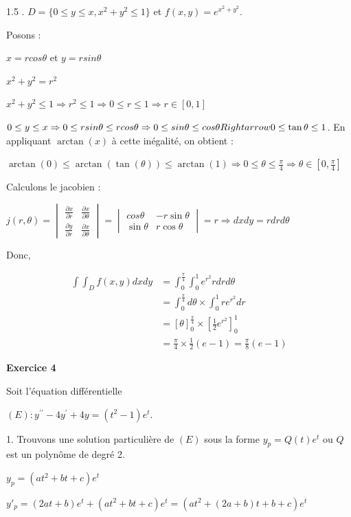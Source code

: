 \documentclass[12pt]{article}
\begin{document}
\begin{spacing}{1.5}
. $D= \lbrace 0\leq y\leq x, x^2+y^2 \leq 1\rbrace$ et $f(x,y)=e^{x^2+y^2}$.

Posons :

$x=rcos\theta$ et $y=rsin\theta$

$x^2+y^2=r^2$

$x^2+y^2 \leq 1\Rightarrow r^2\leq 1\Longrightarrow 0\leq r \leq 1\Longrightarrow r\in [0,1]$

$0\leq y\leq x\Rightarrow 0\leq rsin\theta\leq rcos\theta\Rightarrow 0\leq sin\theta\leq cos\theta\\Rightarrow 0\leq \tan\theta\leq 1$. En appliquant $\arctan(x)$ à cette inégalité, on obtient :

$\arctan(0)\leq \arctan(\tan(\theta))\leq \arctan(1)\Longrightarrow 0\leq \theta\leq \frac{\pi}{4}\Longrightarrow \theta\in [0,\frac{\pi}{4}]$

Calculons le jacobien :

$j(r,\theta)=\begin{vmatrix}
\frac{\partial x}{\partial r} & \frac{\partial x}{\partial \theta}\\
\frac{\partial y}{\partial r} & \frac{\partial x}{\partial \theta}
\end{vmatrix}=\begin{vmatrix}
cos \theta & -r\sin\theta\\
\sin\theta & r\cos\theta
\end{vmatrix}=r\Rightarrow dxdy=rdrd\theta$

Donc,

\begin{align*}
\int\int_{D}f(x,y)dxdy &=\int_0^{\frac{\pi}{4}}\int_{0}^1e^{r^2}rdrd\theta\\
&=\int_0^{\frac{\pi}{4}}d\theta\times\int_{0}^1re^{r^2}dr\\
&=[\theta]_0^{\frac{\pi}{4}}\times[\frac{1}{2}e^{r^2}]_0^1\\
&=\frac{\pi}{4}\times\frac{1}{2}(e-1)=\frac{\pi}{8}(e-1)
\end{align*}

\medskip
\textbf{Exercice 4}

Soit l'équation différentielle

$(E) : y^{\prime\prime}-4y^{\prime} + 4y = (t^2 - 1)e^t$.

1. Trouvons une solution particulière de $(E)$ sous la forme $y_p= Q(t)e^t$ ou $Q$ est un polynôme de degré 2.

$y_p=(at^2+bt+c)e^t$

$y'_p=(2at+b)e^t+(at^2+bt+c)e^t=(at^2+(2a+b)t+b+c)e^t$


\end{spacing}
\end{document}
